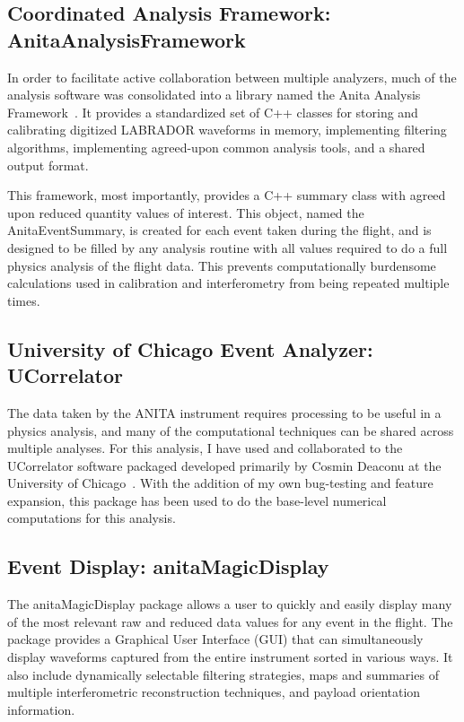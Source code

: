 	\subsection{Coordinated Analysis Framework: AnitaAnalysisFramework}
		In order to facilitate active collaboration between multiple analyzers, much of the analysis software was consolidated into a library named the Anita Analysis Framework~\cite{anitaAnalysisFramework}.  It provides a standardized set of C++ classes for storing and calibrating digitized LABRADOR waveforms in memory, implementing filtering algorithms, implementing agreed-upon common analysis tools, and a shared output format.
		
		This framework, most importantly, provides a C++ summary class with agreed upon reduced quantity values of interest.  This object, named the AnitaEventSummary, is created for each event taken during the flight, and is designed to be filled by any analysis routine with all values required to do a full physics analysis of the flight data.  This prevents computationally burdensome calculations used in calibration and interferometry from being repeated multiple times.
				
	\subsection{University of Chicago Event Analyzer: UCorrelator}
		The data taken by the ANITA instrument requires processing to be useful in a physics analysis, and many of the computational techniques can be shared across multiple analyses.  For this analysis, I have used and collaborated to the UCorrelator software packaged developed primarily by Cosmin Deaconu at the University of Chicago~\cite{UCorrelator}.  With the addition of my own bug-testing and feature expansion, this package has been used to do the base-level numerical computations for this analysis.
		
		
	\subsection{Event Display: anitaMagicDisplay}
		The anitaMagicDisplay package \cite{anitaMagicDisplay} allows a user to quickly and easily display many of the most relevant raw and reduced data values for any event in the flight.  The package provides a Graphical User Interface (GUI) that can simultaneously display waveforms captured from the entire instrument sorted in various ways.  It also include dynamically selectable filtering strategies, maps and summaries of multiple interferometric reconstruction techniques, and payload orientation information.  
		
